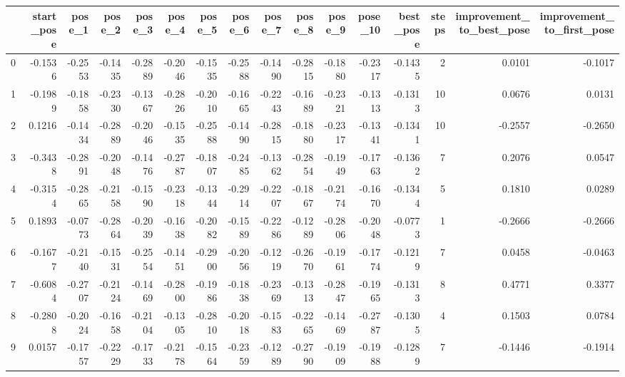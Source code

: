 \begin{tabular}{lrrrrrrrrrrrrrrr}
\toprule
{} &  start\_pose &  pose\_1 &  pose\_2 &  pose\_3 &  pose\_4 &  pose\_5 &  pose\_6 &  pose\_7 &  pose\_8 &  pose\_9 &  pose\_10 &  best\_pose &  steps &  improvement\_to\_best\_pose &  improvement\_to\_first\_pose \\
\midrule
0   &     -0.1536 & -0.2553 & -0.1435 & -0.2889 & -0.2046 & -0.1535 & -0.2588 & -0.1490 & -0.2815 & -0.1880 &  -0.2317 &    -0.1435 &      2 &                    0.0101 &                    -0.1017 \\
1   &     -0.1989 & -0.1858 & -0.2330 & -0.1367 & -0.2826 & -0.2010 & -0.1665 & -0.2243 & -0.1689 & -0.2321 &  -0.1313 &    -0.1313 &     10 &                    0.0676 &                     0.0131 \\
2   &      0.1216 & -0.1434 & -0.2889 & -0.2046 & -0.1535 & -0.2588 & -0.1490 & -0.2815 & -0.1880 & -0.2317 &  -0.1341 &    -0.1341 &     10 &                   -0.2557 &                    -0.2650 \\
3   &     -0.3438 & -0.2891 & -0.2048 & -0.1476 & -0.2787 & -0.1807 & -0.2485 & -0.1362 & -0.2854 & -0.1949 &  -0.1763 &    -0.1362 &      7 &                    0.2076 &                     0.0547 \\
4   &     -0.3154 & -0.2865 & -0.2158 & -0.1590 & -0.2318 & -0.1344 & -0.2914 & -0.2207 & -0.1867 & -0.2174 &  -0.1670 &    -0.1344 &      5 &                    0.1810 &                     0.0289 \\
5   &      0.1893 & -0.0773 & -0.2864 & -0.2039 & -0.1638 & -0.2082 & -0.1589 & -0.2286 & -0.1289 & -0.2806 &  -0.2048 &    -0.0773 &      1 &                   -0.2666 &                    -0.2666 \\
6   &     -0.1677 & -0.2140 & -0.1531 & -0.2554 & -0.1451 & -0.2900 & -0.2056 & -0.1219 & -0.2670 & -0.1961 &  -0.1774 &    -0.1219 &      7 &                    0.0458 &                    -0.0463 \\
7   &     -0.6084 & -0.2707 & -0.2124 & -0.1469 & -0.2800 & -0.1986 & -0.1838 & -0.2369 & -0.1313 & -0.2847 &  -0.1965 &    -0.1313 &      8 &                    0.4771 &                     0.3377 \\
8   &     -0.2808 & -0.2024 & -0.1658 & -0.2104 & -0.1305 & -0.2810 & -0.2018 & -0.1583 & -0.2265 & -0.1469 &  -0.2787 &    -0.1305 &      4 &                    0.1503 &                     0.0784 \\
9   &      0.0157 & -0.1757 & -0.2229 & -0.1733 & -0.2178 & -0.1564 & -0.2359 & -0.1289 & -0.2790 & -0.1909 &  -0.1988 &    -0.1289 &      7 &                   -0.1446 &                    -0.1914 \\

\end{tabular}
